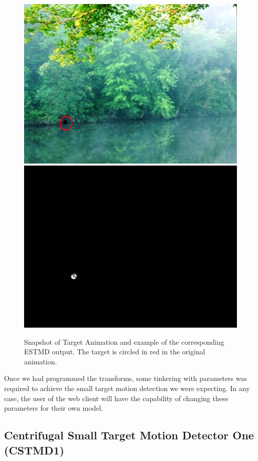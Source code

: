 \documentclass[a4paper,11pt]{article}
\begin{document}
\begin{figure}[H]
\includegraphics[scale = 0.37]{input}
\includegraphics[scale = 0.4575]{processed}
\caption{Snapshot of Target Animation and example of the corresponding ESTMD output. The target is circled in red in the original animation.}
\end{figure}

Once we had programmed the transforms, some tinkering with parameters was required to achieve the small target motion detection we were expecting. In any case, the user of the web client will have the capability of changing these parameters for their own model.

\subsection{Centrifugal Small Target Motion Detector One (CSTMD1)}
\end{document}
